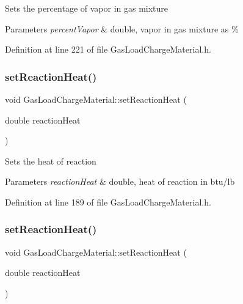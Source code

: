 Sets the percentage of vapor in gas mixture 
\begin{DoxyParams}{Parameters}
{\em percent\+Vapor} & double, vapor in gas mixture as \% \\
\hline
\end{DoxyParams}


Definition at line 221 of file Gas\+Load\+Charge\+Material.\+h.

\mbox{\label{class_gas_load_charge_material_a721f02cbd0bfbb6ebe67c0da09f0b0f2}} 
\subsubsection{\texorpdfstring{set\+Reaction\+Heat()}{setReactionHeat()}\hspace{0.1cm}{\footnotesize\ttfamily [1/3]}}
{\footnotesize\ttfamily void Gas\+Load\+Charge\+Material\+::set\+Reaction\+Heat (\begin{DoxyParamCaption}\item[{double}]{reaction\+Heat }\end{DoxyParamCaption})\hspace{0.3cm}{\ttfamily [inline]}}

Sets the heat of reaction 
\begin{DoxyParams}{Parameters}
{\em reaction\+Heat} & double, heat of reaction in btu/lb \\
\hline
\end{DoxyParams}


Definition at line 189 of file Gas\+Load\+Charge\+Material.\+h.

\mbox{\label{class_gas_load_charge_material_a721f02cbd0bfbb6ebe67c0da09f0b0f2}} 
\subsubsection{\texorpdfstring{set\+Reaction\+Heat()}{setReactionHeat()}\hspace{0.1cm}{\footnotesize\ttfamily [2/3]}}
{\footnotesize\ttfamily void Gas\+Load\+Charge\+Material\+::set\+Reaction\+Heat (\begin{DoxyParamCaption}\item[{double}]{reaction\+Heat }\end{DoxyParamCaption})\hspace{0.3cm}{\ttfamily [inline]}}


